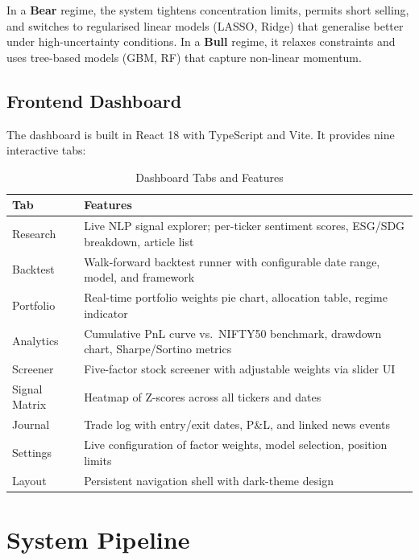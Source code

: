 \documentclass[12pt, a4paper]{article}
\begin{document}
In a \textbf{Bear} regime, the system tightens concentration limits, permits short selling, and switches to regularised linear models (LASSO, Ridge) that generalise better under high-uncertainty conditions. In a \textbf{Bull} regime, it relaxes constraints and uses tree-based models (GBM, RF) that capture non-linear momentum.

\subsection{Frontend Dashboard}

The dashboard is built in React 18 with TypeScript and Vite. It provides nine interactive tabs:

\begin{table}[H]
\centering
\caption{Dashboard Tabs and Features}
\renewcommand{\arraystretch}{1.3}
\small
\begin{tabular}{@{}lp{10cm}@{}}
\toprule
\textbf{Tab} & \textbf{Features} \\ \midrule
Research        & Live NLP signal explorer; per-ticker sentiment scores, ESG/SDG breakdown, article list \\
Backtest        & Walk-forward backtest runner with configurable date range, model, and framework \\
Portfolio       & Real-time portfolio weights pie chart, allocation table, regime indicator \\
Analytics       & Cumulative PnL curve vs.\ NIFTY50 benchmark, drawdown chart, Sharpe/Sortino metrics \\
Screener        & Five-factor stock screener with adjustable weights via slider UI \\
Signal Matrix   & Heatmap of Z-scores across all tickers and dates \\
Journal         & Trade log with entry/exit dates, P\&L, and linked news events \\
Settings        & Live configuration of factor weights, model selection, position limits \\
Layout          & Persistent navigation shell with dark-theme design \\
\bottomrule
\end{tabular}
\end{table}

\section{System Pipeline}
\end{document}
